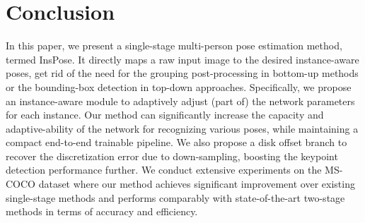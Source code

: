 \documentclass[sigconf]{acmart}
\begin{document}
\section{Conclusion}
In this paper, we present a single-stage multi-person pose estimation method, termed InsPose.
It directly maps a raw input image to the desired instance-aware poses, get rid of the need for the grouping post-processing in bottom-up methods or the bounding-box detection in top-down approaches.
Specifically, we propose an instance-aware module to adaptively adjust (part of) the network parameters for each instance.
Our method can significantly increase the capacity and adaptive-ability of the network for recognizing various poses, while maintaining a compact end-to-end trainable pipeline.
We also propose a disk offset branch to recover the discretization error due to down-sampling, boosting the keypoint detection performance further.
We conduct extensive experiments on the MS-COCO dataset where our method achieves significant improvement over existing single-stage methods and performs comparably with state-of-the-art two-stage methods in terms of accuracy and efficiency.






\end{document}
